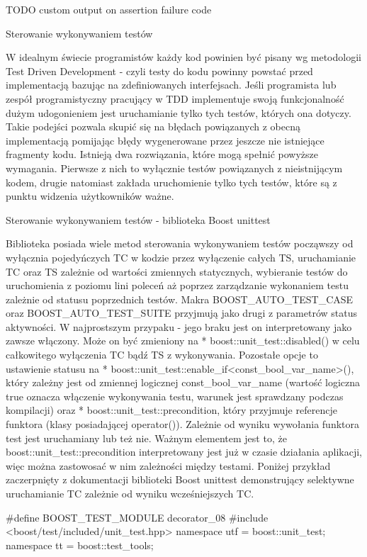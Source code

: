 TODO custom output on assertion failure code

Sterowanie wykonywaniem testów

W idealnym świecie programistów każdy kod powinien być pisany wg metodologii Test Driven Development - czyli testy do kodu powinny powstać przed implementacją bazując na zdefiniowanych interfejsach.
Jeśli programista lub zespół programistyczny pracujący w TDD implementuje swoją funkcjonalność dużym udogonieniem jest uruchamianie tylko tych testów, których ona dotyczy. Takie podejści pozwala skupić się na błędach powiązanych z obecną implementacją pomijając błędy wygenerowane przez jeszcze nie istniejące fragmenty kodu.
Istnieją dwa rozwiązania, które mogą spełnić powyższe wymagania. Pierwsze z nich to wyłącznie testów powiązanych z nieistnijącym kodem, drugie natomiast zakłada uruchomienie tylko tych testów, które są z punktu widzenia użytkowników ważne.

Sterowanie wykonywaniem testów - biblioteka Boost unittest

Biblioteka posiada wiele metod sterowania wykonywaniem testów począwszy od wyłącznia pojedyńczych TC w kodzie przez wyłączenie całych TS, uruchamianie TC oraz TS zależnie od wartości zmiennych statycznych, wybieranie testów do uruchomienia z poziomu lini poleceń aż poprzez zarządzanie wykonaniem testu zależnie od statusu poprzednich testów.
Makra BOOST_AUTO_TEST_CASE oraz BOOST_AUTO_TEST_SUITE przyjmują jako drugi z parametrów status aktywności.
W najprostszym przypaku - jego braku jest on interpretowany jako zawsze włączony. Może on być zmieniony na * boost::unit_test::disabled() w celu całkowitego wyłączenia TC bądź TS z wykonywania. 
Pozostałe opcje to ustawienie statusu na * boost::unit_test::enable_if<const_bool_var_name>(), który zależny jest od zmiennej logicznej const_bool_var_name (wartość logiczna true oznacza włączenie wykonywania testu, warunek jest sprawdzany podczas kompilacji) oraz * boost::unit_test::precondition, który przyjmuje referencje funktora (klasy posiadającej operator()). Zależnie od wyniku wywołania funktora test jest uruchamiany lub też nie. Ważnym elementem jest to, że boost::unit_test::precondition interpretowany jest już w czasie działania aplikacji, więc można zastowosać w nim zależności między testami.
Poniżej przykład zaczerpnięty z dokumentacji biblioteki Boost unittest demonstrujący selektywne uruchamianie TC zależnie od wyniku wcześniejszych TC.

#define BOOST_TEST_MODULE decorator_08
#include <boost/test/included/unit_test.hpp>
namespace utf = boost::unit_test;
namespace tt = boost::test_tools;

